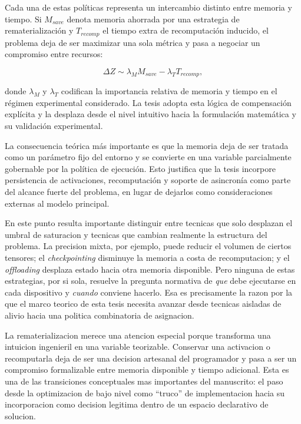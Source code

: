 Cada una de estas políticas representa un intercambio distinto entre memoria y tiempo. Si $M_{save}$ denota memoria ahorrada por una estrategia de rematerialización y $T_{recomp}$ el tiempo extra de recomputación inducido, el problema deja de ser maximizar una sola métrica y pasa a negociar un compromiso entre recursos:

$$
\Delta Z \sim \lambda_M M_{save} - \lambda_T T_{recomp},
$$

donde $\lambda_M$ y $\lambda_T$ codifican la importancia relativa de memoria y tiempo en el régimen experimental considerado. La tesis adopta esta lógica de compensación explícita y la desplaza desde el nivel intuitivo hacia la formulación matemática y su validación experimental.

La consecuencia teórica más importante es que la memoria deja de ser tratada como un parámetro fijo del entorno y se convierte en una variable parcialmente gobernable por la política de ejecución. Esto justifica que la tesis incorpore persistencia de activaciones, recomputación y soporte de asincronía como parte del alcance fuerte del problema, en lugar de dejarlos como consideraciones externas al modelo principal.

En este punto resulta importante distinguir entre tecnicas que solo desplazan el umbral de saturacion y tecnicas que cambian realmente la estructura del problema. La precision mixta, por ejemplo, puede reducir el volumen de ciertos tensores; el \textit{checkpointing} disminuye la memoria a costa de recomputacion; y el \textit{offloading} desplaza estado hacia otra memoria disponible. Pero ninguna de estas estrategias, por si sola, resuelve la pregunta normativa de \textit{que} debe ejecutarse en cada dispositivo y \textit{cuando} conviene hacerlo. Esa es precisamente la razon por la que el marco teorico de esta tesis necesita avanzar desde tecnicas aisladas de alivio hacia una politica combinatoria de asignacion.

La rematerializacion merece una atencion especial porque transforma una intuicion ingenieril en una variable teorizable. Conservar una activacion o recomputarla deja de ser una decision artesanal del programador y pasa a ser un compromiso formalizable entre memoria disponible y tiempo adicional. Esta es una de las transiciones conceptuales mas importantes del manuscrito: el paso desde la optimizacion de bajo nivel como ``truco'' de implementacion hacia su incorporacion como decision legitima dentro de un espacio declarativo de solucion.

